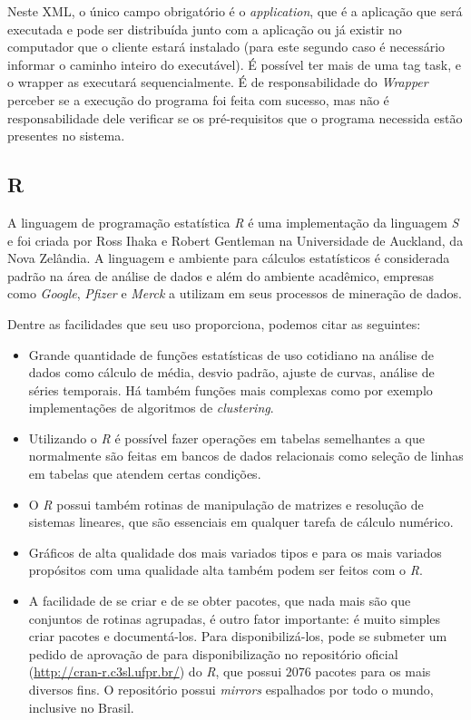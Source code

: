 Neste XML, o único campo obrigatório é o \emph{application}, que é a aplicação
que será executada e pode ser distribuída junto com a aplicação ou já existir no 
computador que o cliente estará instalado (para este segundo caso é necessário
informar o caminho inteiro do executável). É possível ter mais de uma tag
task, e o wrapper as executará sequencialmente. É de responsabilidade
do \textit{Wrapper} perceber se a execução do programa foi feita com sucesso, 
mas não é responsabilidade dele verificar se os pré-requisitos que o programa necessida
estão presentes no sistema. 


\subsection{R}

A linguagem de programação estatística \emph{R} é uma implementação da linguagem \emph{S} e foi criada por Ross Ihaka e Robert
Gentleman na Universidade de Auckland, da Nova Zelândia. A linguagem e ambiente para cálculos estatísticos é considerada
padrão %
na área de análise de dados e além do ambiente acadêmico, empresas como \emph{Google}, \emph{Pfizer} e \emph{Merck} a utilizam em seus
processos de mineração de dados. 

Dentre as facilidades que seu uso proporciona, podemos citar as seguintes:

\begin{itemize}
  \item Grande quantidade de funções estatísticas de uso cotidiano na análise de dados
como cálculo de média, desvio padrão, ajuste de curvas, análise de séries temporais. Há também funções mais complexas como por 
exemplo implementações de algoritmos de \emph{clustering}. 
  \item Utilizando o \emph{R} é possível fazer operações em tabelas semelhantes a que normalmente 
são feitas em bancos de dados relacionais como seleção de linhas em tabelas que atendem
certas condições. 
  \item O \emph{R} possui também rotinas de manipulação de matrizes e resolução de sistemas lineares, que são essenciais
em qualquer tarefa de cálculo numérico. 
  \item Gráficos de alta qualidade dos mais variados tipos e para os mais variados propósitos com uma qualidade alta 
também podem ser feitos com o \emph{R}. 
  \item A facilidade de se criar e de se obter pacotes, que nada mais são que conjuntos de rotinas agrupadas, é outro fator
importante: é muito simples criar pacotes e documentá-los. Para disponibilizá-los, pode se submeter um pedido de aprovação 
de para disponibilização no repositório oficial (\url{http://cran-r.c3sl.ufpr.br/})  
do \emph{R}, que possui $2076$ pacotes para os mais diversos fins. O repositório possui \emph{mirrors} espalhados por
todo o mundo, inclusive no Brasil.  
\end{itemize}

